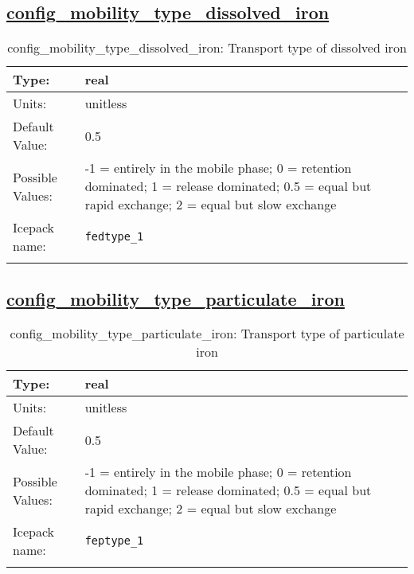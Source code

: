 \subsection[config\_mobility\_type\_dissolved\_iron]{\hyperref[sec:nm_tab_biogeochemistry]{config\_mobility\_type\_dissolved\_iron}}
\label{subsec:nm_sec_config_mobility_type_dissolved_iron}
\begin{center}
\begin{longtable}{| p{2.0in} || p{4.0in} |}
    \hline
    Type: & real \\
    \hline
    Units: & \si{unitless} \\
    \hline
    Default Value: & 0.5 \\
    \hline
    Possible Values: & -1 = entirely in the mobile phase; 0 = retention dominated; 1 = release dominated; 0.5 = equal but rapid exchange; 2 = equal but slow exchange \\
    \hline
    \hline
    Icepack name: & \verb+fedtype_1+ \\
    \caption{config\_mobility\_type\_dissolved\_iron: Transport type of dissolved iron}
\end{longtable}
\end{center}
\subsection[config\_mobility\_type\_particulate\_iron]{\hyperref[sec:nm_tab_biogeochemistry]{config\_mobility\_type\_particulate\_iron}}
\label{subsec:nm_sec_config_mobility_type_particulate_iron}
\begin{center}
\begin{longtable}{| p{2.0in} || p{4.0in} |}
    \hline
    Type: & real \\
    \hline
    Units: & \si{unitless} \\
    \hline
    Default Value: & 0.5 \\
    \hline
    Possible Values: & -1 = entirely in the mobile phase; 0 = retention dominated; 1 = release dominated; 0.5 = equal but rapid exchange; 2 = equal but slow exchange \\
    \hline
    \hline
    Icepack name: & \verb+feptype_1+ \\
    \caption{config\_mobility\_type\_particulate\_iron: Transport type of particulate iron}
\end{longtable}
\end{center}
